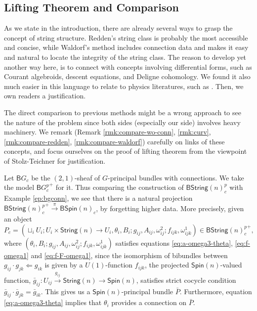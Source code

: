 \documentclass[letterpaper,10pt, oneside]{article} %
\newcommand{\bstringnp}{\mathsf{BString}(n)^p_{c}} %
\newcommand{\String}{\mathsf{String}}%
\newcommand{\Spin}{\mathsf{Spin}}%
\newcommand{\bg}{\bar{g}}
\begin{document}
\subsection{Lifting Theorem and Comparison}\label{sec:string-lift}

As we state in the introduction, there are already several ways to
grasp the concept of string structure. Redden's string
class is probably the most accessible and concise, while Waldorf's
method includes connection data and makes it easy and natural to locate the
integrity of the string class. The reason to develop yet another way
here, is to connect with
concepts involving differential forms, such as Courant algebroids,
descent equations, and Deligne cohomology. We found it also much
easier in this language to relate to physics literatures, such as
\cite{fss:characteristic-classes}.  Then, we own readers a
justification.

The direct comparison to previous methods might be a
wrong approach to see the nature of the problem since both sides
(especially our side) involves heavy machinery. We
remark (Remark \ref{rmk:compare-wo-conn}, \ref{rmk:curv},
\ref{rmk:compare-redden}, \ref{rmk:compare-waldorf}) carefully on links of these concepts, and
focus ourselves on the proof of lifting theorem from the viewpoint of Stolz-Teichner for justification.


Let $\mathsf{B}G_{c}$ be the $(2, 1)$-sheaf of $G$-principal bundles with
connections. We take the model  ${\mathsf{B}G^p_c}^+$ for it. Thus comparing the construction of $\bstringnp$ with Example \ref{ep:bgconn}, we see that  there is a natural projection ${\bstringnp}^+
\xrightarrow{\pi} \mathsf{B}\Spin(n)_c$, by forgetting higher data. More precisely, given an object $$P_c =( \sqcup_i
U_{i}; U_i\times \String(n)\to U_i, \theta_i, B_i;
g_{ij}, A_{ij}, \omega^2_{ij}; f_{ijk}, \omega^1_{ijk}) \in  {\bstringnp}^+,$$
where $(\theta_i,B_i;
g_{ij}, A_{ij}, \omega^2_{ij}; f_{ijk}, \omega^1_{ijk})$ satisfies
equations \eqref{eq:a-omega3-theta}, \eqref{eq:f-omega1} and
\eqref{eq:f-F-omega1}, since the isomorphism of bibundles between $g_{ij}\cdot
g_{jk} \Leftarrow g_{ik}$ is given by a $U(1)$-function   $f_{ijk}$,
the projected $\Spin(n)$-valued function, $\bg_{ij}: U_{ij}
\xrightarrow{g_{ij}} \String(n) \to \Spin(n)$, satisfies strict cocycle
condition $\bg_{ij}\cdot \bg_{jk} =\bg_{ik}$. This gives us a
$\Spin(n)$-principal bundle $\bar{P}$. Furthermore, equation \eqref{eq:a-omega3-theta} implies that $\theta_i$
provides a connection on $\bar{P}$.
\end{document}
